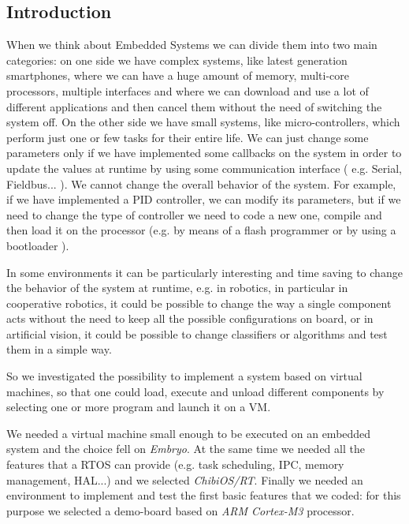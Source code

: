 \documentclass[a4paper,10pt]{article}
\begin{document}
\vspace{4ex}	%
\begin{multicols}{2}

\section{Introduction}

When we think about Embedded Systems we can divide them into two main categories: on one side we have complex systems, like latest generation smartphones, where we can have a huge amount of memory, multi-core processors, multiple interfaces and where we can download and use a lot of different applications and then cancel them without the need of switching the system off. On the other side we have small systems, like micro-controllers, which perform just one or few tasks for their entire life. We can just change some parameters only if we have implemented some callbacks on the system in order to update the values at runtime by using some communication interface ( e.g. Serial, Fieldbus... ). We cannot change the overall behavior of the system. For example, if we have implemented a PID controller, we can modify its parameters, but if we need to change the type of controller we need to code a new one, compile and then load it on the processor (e.g. by means of a flash programmer or by using a bootloader ).\newline

In some environments it can be particularly interesting and time saving to change the behavior of the system at runtime, e.g. in robotics, in particular in cooperative robotics, it could be possible to change the way a single component acts without the need to keep all the possible configurations on board, or in artificial vision, it could be possible to change classifiers or algorithms and test them in a simple way.\newline

So we investigated the possibility to implement a system based on virtual machines, so that one could load, execute and unload different components by selecting one or more program and launch it on a VM.\newline

We needed a virtual machine small enough to be executed on an embedded system and the choice fell on \textit{Embryo}. At the same time we needed all the features that a RTOS can provide (e.g. task scheduling, IPC, memory management, HAL...) and we selected \textit{ChibiOS/RT}. Finally we needed an environment to implement and test the first basic features that we coded: for this purpose we selected a demo-board based on \textit{ARM Cortex\texttrademark-M3} processor.


\end{multicols}
\end{document}
